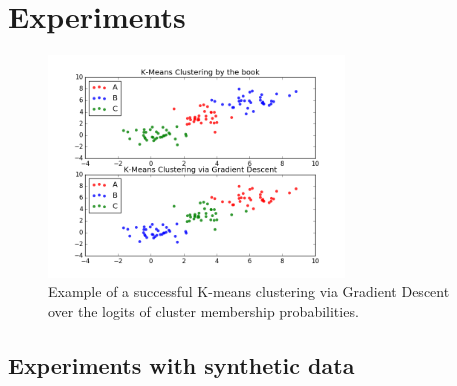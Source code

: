 \chapter{Experiments}
\label{experiments}

\begin{figure}
\centering
\includegraphics[width=0.7\textwidth]{imgs/gd_clust_good_attempt.png}
\caption{\label{fig:gd_clust_good} Example of a successful K-means clustering via Gradient Descent over the logits of cluster membership probabilities.}
\end{figure}
\section{Experiments with synthetic data}
